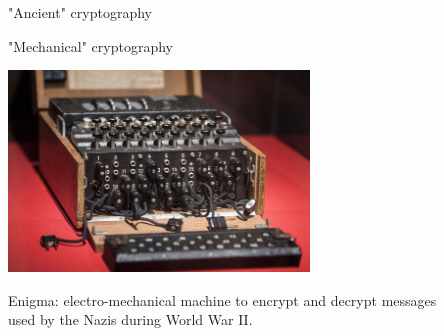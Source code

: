 \documentclass[handout, xcolor=dvipsnames,aspectratio=169]{beamer}
\begin{document}
\begin{frame}{"Ancient" cryptography}

  \pause

  \begin{figure}%
    \centering
    \pause
    \qquad
  \end{figure}

\end{frame}

\begin{frame}{"Mechanical" cryptography}

  \centering

  \includegraphics[width=0.6\textwidth]{img/enigma}

  Enigma: electro-mechanical machine to encrypt and decrypt messages\\
  used by the Nazis during World War II.

\end{frame}
\end{document}
